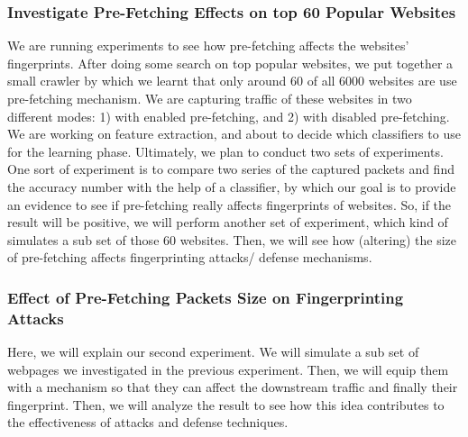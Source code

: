 \documentclass{sig-alternate-05-2015}
\begin{document}
\subsubsection{Investigate Pre-Fetching Effects on top 60 Popular Websites}
We are running experiments to see how pre-fetching affects the websites' fingerprints.
After doing some search on top popular websites, we put together a small crawler by which we learnt that only around 60 of all 6000 websites are use pre-fetching mechanism. We are capturing traffic of these websites in two different modes: 1) with enabled pre-fetching, and 2) with disabled pre-fetching. We are working on feature extraction, and about to decide which classifiers to use for the learning phase.
Ultimately, we plan to conduct two sets of experiments. One sort of experiment is to compare two series of the captured packets and find the accuracy number with the help of a classifier, by which our goal is to provide an evidence to see if pre-fetching really affects fingerprints of websites. So, if the result will be positive, we will perform another set of experiment, which kind of simulates a sub set of those 60 websites. Then, we will see how (altering) the size of pre-fetching affects fingerprinting attacks/ defense mechanisms.


\subsubsection{Effect of Pre-Fetching Packets Size on Fingerprinting Attacks}
Here, we will explain our second experiment. We will simulate a sub set of webpages we investigated in the previous experiment. Then, we will equip them with a mechanism so that they can affect the downstream traffic and finally their fingerprint. Then, we will analyze the result to see how this idea contributes to the effectiveness of attacks and defense techniques.
%

\end{document}
